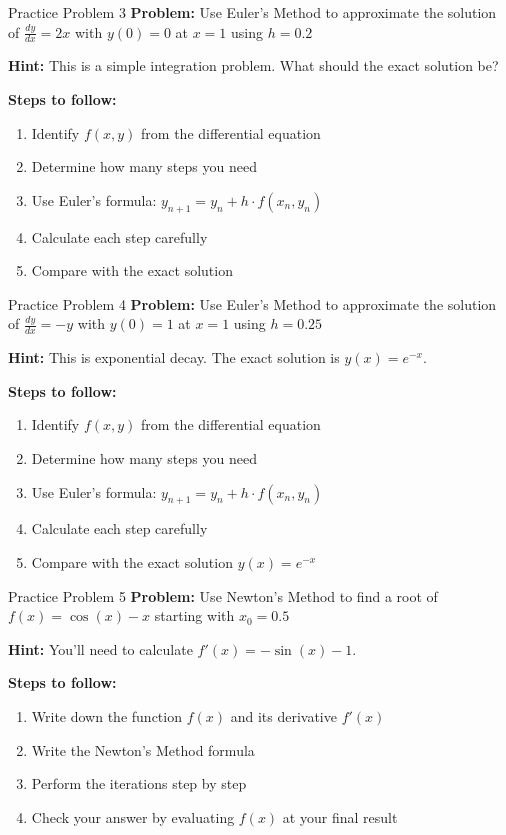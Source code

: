 \documentclass[aspectratio=169]{beamer}
\begin{document}
\begin{frame}{Practice Problem 3}
\textbf{Problem:} Use Euler's Method to approximate the solution of $\frac{dy}{dx} = 2x$ with $y(0) = 0$ at $x = 1$ using $h = 0.2$

\textbf{Hint:} This is a simple integration problem. What should the exact solution be?

\vspace{1cm}
\textbf{Steps to follow:}
\begin{enumerate}
    \item Identify $f(x,y)$ from the differential equation
    \item Determine how many steps you need
    \item Use Euler's formula: $y_{n+1} = y_n + h \cdot f(x_n, y_n)$
    \item Calculate each step carefully
    \item Compare with the exact solution
\end{enumerate}
\end{frame}

\begin{frame}{Practice Problem 4}
\textbf{Problem:} Use Euler's Method to approximate the solution of $\frac{dy}{dx} = -y$ with $y(0) = 1$ at $x = 1$ using $h = 0.25$

\textbf{Hint:} This is exponential decay. The exact solution is $y(x) = e^{-x}$.

\vspace{1cm}
\textbf{Steps to follow:}
\begin{enumerate}
    \item Identify $f(x,y)$ from the differential equation
    \item Determine how many steps you need
    \item Use Euler's formula: $y_{n+1} = y_n + h \cdot f(x_n, y_n)$
    \item Calculate each step carefully
    \item Compare with the exact solution $y(x) = e^{-x}$
\end{enumerate}
\end{frame}

\begin{frame}{Practice Problem 5}
\textbf{Problem:} Use Newton's Method to find a root of $f(x) = \cos(x) - x$ starting with $x_0 = 0.5$

\textbf{Hint:} You'll need to calculate $f'(x) = -\sin(x) - 1$.

\vspace{1cm}
\textbf{Steps to follow:}
\begin{enumerate}
    \item Write down the function $f(x)$ and its derivative $f'(x)$
    \item Write the Newton's Method formula
    \item Perform the iterations step by step
    \item Check your answer by evaluating $f(x)$ at your final result
\end{enumerate}
\end{frame}
\end{document}
